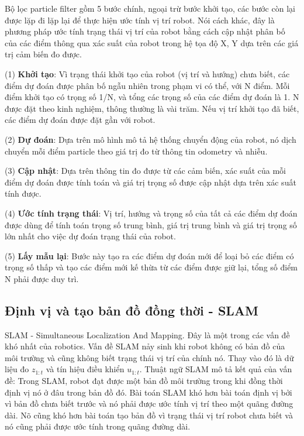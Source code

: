 {{Bộ lọc particle filter gồm 5 bước chính, ngoại trừ bước khởi tạo, các bước còn lại được lặp đi lặp lại để thực hiện ước tính vị trí robot. Nói cách khác, đây là phương pháp ước tính trạng thái vị trí của robot bằng cách cập nhật phân bố của các điểm thông qua xác suất của robot trong hệ tọa độ X, Y dựa trên các giá trị cảm biến đo được.

(1) \textbf{Khởi tạo}:
Vì trạng thái khởi tạo của robot (vị trí và hướng) chưa biết, các điểm dự đoán được phân bố ngẫu nhiên trong phạm vi có thể, với N điểm. Mỗi điểm khởi tạo có trọng số 1/N, và tổng các trọng số của các điểm dự đoán là 1. N được đặt theo kinh nghiệm, thông thường là vài trăm. Nếu vị trí khởi tạo đã biết, các điểm dự đoán được đặt gần với robot.

(2) \textbf{Dự đoán}: Dựa trên mô hình mô tả hệ thống chuyển động của robot, nó dịch chuyển mỗi điểm particle theo giá trị đo từ thông tin odometry và nhiễu.

(3) \textbf{Cập nhật}: Dựa trên thông tin đo được từ các cảm biến, xác suất của mỗi điểm dự đoán được tính toán và giá trị trọng số được cập nhật dựa trên xác suất tính được.

(4) \textbf{Ước tính trạng thái}: Vị trí, hướng và trọng số của tất cả các điểm dự đoán được dùng để tính toán trọng số trung bình, giá trị trung bình và giá trị trọng số lớn nhất cho việc dự đoán trạng thái của robot.

(5) \textbf{Lấy mẫu lại}: Bước này tạo ra các điểm dự đoán mới để loại bỏ các điểm có trọng số thấp và tạo các điểm mới kế thừa từ các điểm được giữ lại, tổng số điểm N phải được duy trì.

\subsection{Định vị và tạo bản đồ đồng thời - SLAM}}

SLAM - Simultaneous Localization And Mapping. Đây là một trong các vấn đề khó nhất của robotics. Vấn đề SLAM nảy sinh khi robot không có bản đồ của môi trường và cũng không biết trạng thái vị trí của chính nó. Thay vào đó là dữ liệu đo ${z}_{1:t}$ và tín hiệu điều khiển ${u}_{1:t}$. Thuật ngữ SLAM mô tả kết quả của vấn đề: Trong SLAM, robot đạt được một bản đồ môi trường trong khi đồng thời định vị nó ở đâu trong bản đồ đó. Bài toán SLAM khó hơn bài toán định vị bởi vì bản đồ chưa biết trước và nó phải được ước tính vị trí theo một quãng đường dài. Nõ cũng khó hơn bài toán tạo bản đồ vì trạng thái vị trí robot chưa biết và nó cũng phải được ước tính trong quãng đường dài.

}
